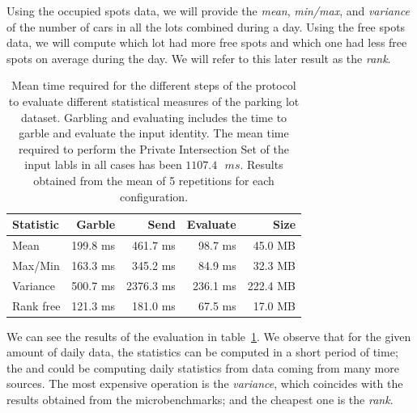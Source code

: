 Using the occupied spots data, we will provide the \emph{mean}, \emph{min/max},
and \emph{variance} of the number of cars in all the lots combined during a
day.  Using the free spots data, we will compute which lot had more free spots
and which one had less free spots on average during the day.  We will refer to
this later result as the \emph{rank}.

\begin{table}
    \begin{tabular}{l*{3}{r}r}
    \textbf{Statistic}  & \textbf{Garble} & \textbf{Send} & \textbf{Evaluate} & \textbf{Size} \\
    \hline
    Mean       & 199.8 ms & 461.7 ms & 98.7  ms & 45.0 MB \\
    Max/Min    & 163.3 ms & 345.2 ms & 84.9  ms & 32.3 MB \\
    Variance   & 500.7 ms & 2376.3 ms & 236.1 ms & 222.4 MB \\
    \hline
    Rank free  & 121.3 ms & 181.0 ms & 67.5 ms & 17.0 MB \\
    \end{tabular}
    \caption{Mean time required for the different steps of the protocol to
      evaluate different statistical measures of the parking lot dataset.
      Garbling and evaluating includes the time to garble and evaluate the
      input identity.  The mean time required to perform the Private
      Intersection Set of the input labls in all cases has been 
      \mbox{$1107.4 \text{ } ms$}.  Results obtained from the mean of 5 repetitions for
      each configuration.}
    \label{stats-times}
\end{table}

We can see the results of the evaluation in table~\ref{stats-times}.  We
observe that for the given amount of daily data, the statistics can be computed
in a short period of time; the \broker and \garbler could be computing daily
statistics from data coming from many more sources.  The most expensive
operation is the \emph{variance}, which coincides with the results obtained
from the microbenchmarks; and the cheapest one is the \emph{rank}.


